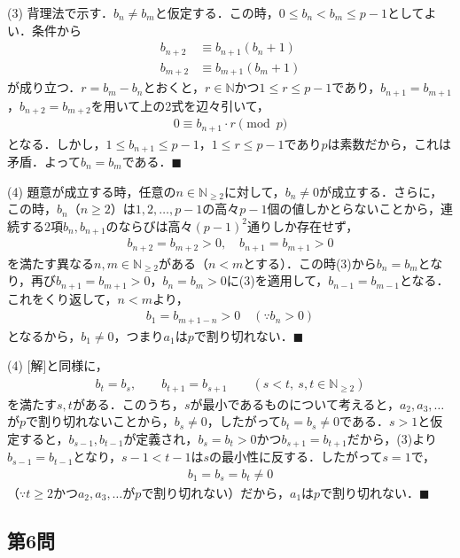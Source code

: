 \documentclass[../main.tex]{subfiles}
\begin{document}
(3) 背理法で示す．$b_n\ne b_m$と仮定する．この時，$0\le b_n<b_m\le p-1$としてよい．条件から
\begin{align*}
  b_{n+2}&\equiv b_{n+1}(b_n+1)\\
  b_{m+2}&\equiv b_{m+1}(b_m+1)
\end{align*}
が成り立つ．$r=b_m-b_n$とおくと，$r\in\mathbb N$かつ$1\le r\le p-1$であり，$b_{n+1}=b_{m+1}$，$b_{n+2}=b_{m+2}$を用いて上の2式を辺々引いて，
\begin{align*}
  0\equiv b_{n+1}\cdot r\pmod p
\end{align*}
となる．しかし，$1\le b_{n+1}\le p-1$，$1\le r\le p-1$であり$p$は素数だから，これは矛盾．よって$b_n=b_m$である．$\blacksquare$

(4) 題意が成立する時，任意の$n\in\mathbb N_{\ge2}$に対して，$b_n\ne0$が成立する．さらに，この時，$b_n$（$n\ge2$）は$1,2,\ldots,p-1$の高々$p-1$個の値しかとらないことから，連続する2項$b_n,b_{n+1}$のならびは高々$(p-1)^2$通りしか存在せず，
\begin{align*}
  b_{n+2}=b_{m+2}>0,\quad b_{n+1}=b_{m+1}>0
\end{align*}
を満たす異なる$n,m\in\mathbb N_{\ge2}$がある（$n<m$とする）．この時(3)から$b_n=b_m$となり，再び$b_{n+1}=b_{m+1}>0$，$b_n=b_m>0$に(3)を適用して，$b_{n-1}=b_{m-1}$となる．これをくり返して，$n<m$より，
\begin{align*}
  b_1=b_{m+1-n}>0\quad(\because b_n>0)
\end{align*}
となるから，$b_1\ne0$，つまり$a_1$は$p$で割り切れない．$\blacksquare$

\bigskip
\noindent{\bf [解2]}
(4) [解]と同様に，
\begin{align*}
  b_t=b_s,\qquad b_{t+1}=b_{s+1}\qquad(s<t,\ s,t\in\mathbb N_{\ge2})
\end{align*}
を満たす$s,t$がある．このうち，$s$が最小であるものについて考えると，$a_2,a_3,\ldots$が$p$で割り切れないことから，$b_s\ne0$，したがって$b_t=b_s\ne0$である．$s>1$と仮定すると，$b_{s-1},b_{t-1}$が定義され，$b_s=b_t>0$かつ$b_{s+1}=b_{t+1}$だから，(3)より$b_{s-1}=b_{t-1}$となり，$s-1<t-1$は$s$の最小性に反する．したがって$s=1$で，
\begin{align*}
  b_1=b_s=b_t\ne0
\end{align*}
（$\because t\ge2$かつ$a_2,a_3,\ldots$が$p$で割り切れない）だから，$a_1$は$p$で割り切れない．$\blacksquare$

\subsection*{第6問}
\end{document}
